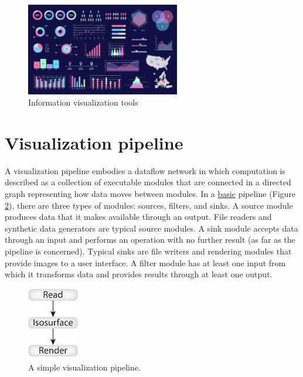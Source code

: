 \begin{figure}[h!]
  \center
  \includegraphics[width=0.60\textwidth]{images/chapter2/types-of-data-visualization.jpg}
  \caption{Information visualization tools}
  \label{fig:infoViseType}
\end{figure}

\section{Visualization pipeline}
\label{sec:visualization_pipeline}
A visualization pipeline embodies a dataflow network in which computation is described as a collection of executable modules that are connected in a directed graph representing how data moves between modules. In a \underline{basic} pipeline (Figure \ref{fig:simplepipeline}), there are three types of modules: sources, filters, and sinks. A source module produces data that it makes available through an output. File readers and synthetic data generators are typical source modules. A sink module accepts data through an input and performs an operation with no further result (as far as the pipeline is concerned). Typical sinks are file writers and rendering modules that provide images to a user interface. A filter module has at least one input from which it transforms data and provides results through at least one output\cite{morelandSurveyVisualizationPipelines2013}.

\begin{figure}[h!]
  \center
  \includegraphics[width=0.20\textwidth]{images/chapter2/simplepipline.PNG}
  \caption{A simple visualization pipeline.}
  \label{fig:simplepipeline}
\end{figure}

